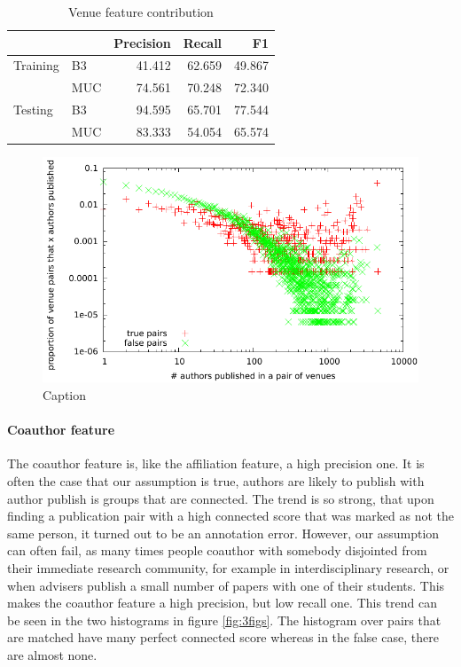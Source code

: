 \documentclass[twocolumn,letterpaper]{article}
\begin{document}
\begin{table}
\begin{tabular}{l || l | r r r}
 & & Precision & Recall & F1 \\ \hline
Training & B3 & 41.412 & 62.659 & 49.867 \\
 & MUC & 74.561 & 70.248 & 72.340\\ \hline
Testing & B3 & 94.595 & 65.701 & 77.544 \\
 & MUC & 83.333 & 54.054 & 65.574 \\
\end{tabular}
\caption{Venue feature contribution}
\label{tab:venue}
\end{table}

\begin{figure}
  \centering
  \includegraphics[width=\columnwidth]{venuestat_dataset}
  \caption{Caption}
  \label{fig:venuedataset}
\end{figure}

\paragraph{Coauthor feature} %
\label{par:coauthor_feature}
The coauthor feature is, like the affiliation feature, a high precision one.  It is often the case that our assumption is true, authors are likely to publish with author publish is groups that are connected. The trend is so strong, that upon finding a publication pair with a high connected score that was marked as not the same person, it turned out to be an annotation error. However, our assumption can often fail, as many times people coauthor with somebody disjointed from their immediate research community, for example in interdisciplinary research, or when advisers publish a small number of papers with one of their students. This makes the coauthor feature a high precision, but low recall one. This trend can be seen in the two histograms in figure \ref{fig:3figs}. The histogram over pairs that are matched have many perfect connected score whereas in the false case, there are almost none. 
\end{document}
